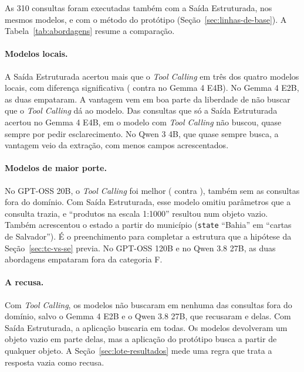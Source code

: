 As 310 consultas foram executadas também com a Saída Estruturada, nos mesmos modelos, e com o método do protótipo (Seção~\ref{sec:linhas-de-base}). A Tabela~\ref{tab:abordagens} resume a comparação.

\begin{landscape}
\end{landscape}

\paragraph{Modelos locais.} A Saída Estruturada acertou mais que o \textit{Tool Calling} em três dos quatro modelos locais, com diferença significativa ( contra  no Gemma 4 E4B). No Gemma 4 E2B, as duas empataram. A vantagem vem em boa parte da liberdade de não buscar que o \textit{Tool Calling} dá ao modelo. Das  consultas que só a Saída Estruturada acertou no Gemma 4 E4B, em  o modelo com \textit{Tool Calling} não buscou, quase sempre por pedir esclarecimento. No Qwen 3 4B, que quase sempre busca, a vantagem veio da extração, com menos campos acrescentados.

\paragraph{Modelos de maior porte.} No GPT-OSS 20B, o \textit{Tool Calling} foi melhor ( contra ), também sem as consultas fora do domínio. Com Saída Estruturada, esse modelo omitiu parâmetros que a consulta trazia, e ``produtos na escala 1:1000'' resultou num objeto vazio. Também acrescentou o estado a partir do município (\texttt{state} ``Bahia'' em ``cartas de Salvador''). É o preenchimento para completar a estrutura que a hipótese da Seção~\ref{sec:tc-vs-se} previa. No GPT-OSS 120B e no Qwen 3.8 27B, as duas abordagens empataram fora da categoria F.

\paragraph{A recusa.} Com \textit{Tool Calling}, os modelos não buscaram em nenhuma das  consultas fora do domínio, salvo o Gemma 4 E2B e o Qwen 3.8 27B, que recusaram  e  delas. Com Saída Estruturada, a aplicação buscaria em todas. Os modelos devolveram um objeto vazio em parte delas, mas a aplicação do protótipo busca a partir de qualquer objeto. A Seção~\ref{sec:lote-resultados} mede uma regra que trata a resposta vazia como recusa.

